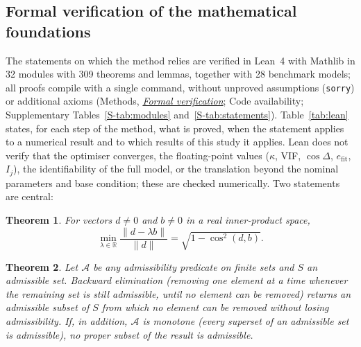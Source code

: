 \documentclass[pdflatex,sn-nature]{sn-jnl}
\theoremstyle{plain}
\newtheorem{theorem}{Theorem}
\newcommand{\mref}[2]{\hyperref[#1]{#2}}
\begin{document}
\subsection*{Formal verification of the mathematical foundations}\label{sec:formal}

The statements on which the method relies are verified in Lean~4 with Mathlib in 32 modules with 309 theorems and lemmas, together with 28 benchmark models; all proofs compile with a single command, without unproved assumptions (\texttt{sorry}) or additional axioms (Methods, \mref{met:formal}{\emph{Formal verification}}; Code availability; Supplementary Tables~\ref{S-tab:modules} and~\ref{S-tab:statements}). Table~\ref{tab:lean} states, for each step of the method, what is proved, when the statement applies to a numerical result and to which results of this study it applies. Lean does not verify that the optimiser converges, the floating-point values ($\kappa$, VIF, $\cos\Delta$, $e_{\mathrm{fit}}$, $I_j$), the identifiability of the full model, or the translation beyond the nominal parameters and base condition; these are checked numerically. Two statements are central:

\begin{theorem}\label{thm:cos}
For vectors $d\neq 0$ and $b\neq 0$ in a real inner-product space,
\begin{equation*}
\min_{\lambda\in\mathbb{R}}\frac{\|d-\lambda b\|}{\|d\|} = \sqrt{1-\cos^2(d,b)}.
\end{equation*}
\end{theorem}

\begin{theorem}\label{thm:prune}
Let $\mathcal{A}$ be any admissibility predicate on finite sets and $S$ an admissible set. Backward elimination (removing one element at a time whenever the remaining set is still admissible, until no element can be removed) returns an admissible subset of $S$ from which no element can be removed without losing admissibility. If, in addition, $\mathcal{A}$ is monotone (every superset of an admissible set is admissible), no proper subset of the result is admissible.
\end{theorem}
\end{document}
